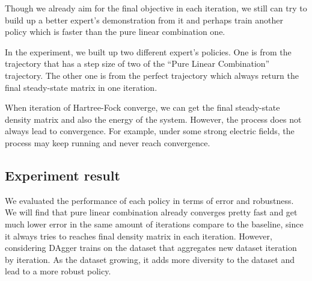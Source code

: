 \documentclass[twoside]{article}
\begin{document}
Though we already aim for the final objective in each iteration, we still can try to build up a better expert's demonstration from it and perhaps train another policy which is faster than the pure linear combination one.

In the experiment, we built up two different expert's policies. 
One is from the trajectory that has a step size of two of the ``Pure Linear Combination'' trajectory. The other one is from the perfect trajectory which always return the final steady-state matrix in one iteration.


When iteration of Hartree-Fock converge, we can get the final steady-state density matrix and also the energy of the system. However, the process does not always lead to convergence. For example, under some strong electric fields, the process may keep running and never reach convergence.






 


\subsection{Experiment result}

We evaluated the performance of each policy in terms of error and robustness. We will find that pure linear combination already converges pretty fast and get much lower error in the same amount of iterations compare to the baseline, since it always tries to reaches final density matrix in each iteration. However, considering DAgger trains on the dataset that aggregates new dataset iteration by iteration. As the dataset growing, it adds more diversity to the dataset and lead to a more robust policy. %
\end{document}
